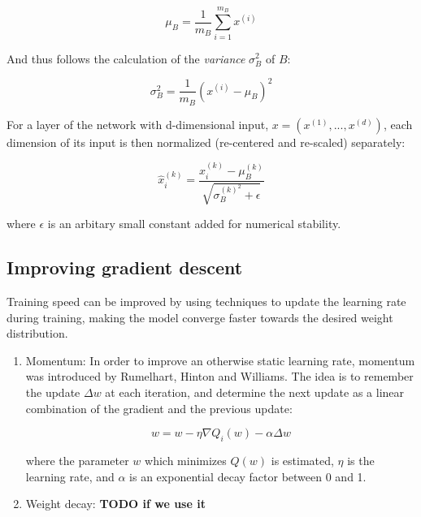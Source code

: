 \documentclass[english, bibtex]{kththesis}
\begin{document}
\begin{enumerate}
\begin{equation}
	\mu_B = \frac{1}{m_B} \sum_{i=1}^{m_B} x^{(i)}
  	\label{eqn:bnmean}
\end{equation}

And thus follows the calculation of the \textit{variance} $\sigma_B^2$ of $B$:

\begin{equation}
	\sigma_B^2 = \frac{1}{m_B} (x^{(i)} - \mu_B)^2
  	\label{eqn:bnvariance}
\end{equation}

For a layer of the network with d-dimensional input, $ x = (x^{(1)}, ..., x^{(d)}) $, each dimension of its input is then normalized (re-centered and re-scaled) separately:

\begin{equation}
	\hat{x}_{i}^{(k)} = \frac{x_{i}^{(k)} - \mu_{B}^{(k)}}{\sqrt{\sigma_{B}^{(k)^2} + \epsilon}}
  	\label{eqn:bnorm}
\end{equation}

where $\epsilon$ is an arbitary small constant added for numerical stability.

\end{enumerate}
\subsection{Improving gradient descent}

Training speed can be improved by using techniques to update the learning rate during training, making the model converge faster towards the desired weight distribution.
\begin{enumerate}
\item Momentum\cite{Rumelhart1986}: In order to improve an otherwise static learning rate, momentum was introduced by Rumelhart, Hinton and Williams. The idea is to remember the update $\Delta w$ at each iteration, and determine the next update as a linear combination of the gradient and the previous update: 

\begin{equation}
	w = w - \eta \nabla Q_i(w)- \alpha \Delta w
  	\label{eqn:momentum}
\end{equation}

where the parameter $w$ which minimizes $Q(w)$ is estimated, $\eta$ is the learning rate, and $\alpha$ is an exponential decay factor between 0 and 1.

\item Weight decay: \textbf{TODO if we use it}
\end{enumerate}
\end{document}
